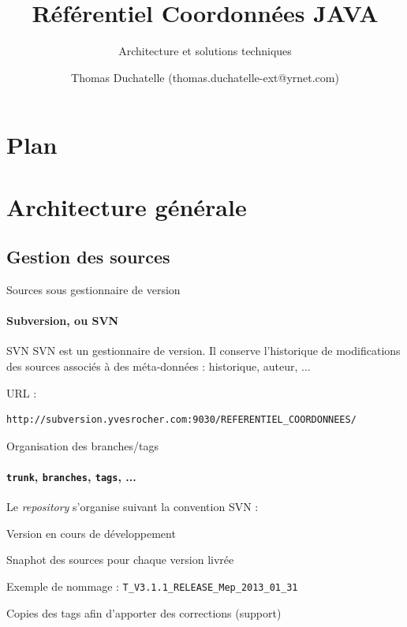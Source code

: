 \documentclass[compact]{beamer}%
\title{Référentiel Coordonnées JAVA}
\subtitle{Architecture et solutions techniques}
\author{Thomas Duchatelle (thomas.duchatelle-ext@yrnet.com)}
\institute{Yves Rocher}
\begin{document}
\frame{\titlepage}
  
\section*{Plan}
\frame{\tableofcontents[hideallsubsections]}
	
\section{Architecture générale}

\subsection{Gestion des sources}

\begin{frame}[fragile]{Sources sous gestionnaire de version}
	\framesubtitle{Subversion, ou SVN}

	\begin{block}{SVN}
	SVN est un gestionnaire de version. Il conserve l'historique de modifications des sources associés à des méta-données : historique, auteur, ...
	\end{block}
	
	\pause
	URL : 
	\begin{lstlisting}
http://subversion.yvesrocher.com:9030/REFERENTIEL_COORDONNEES/
	\end{lstlisting}	

\end{frame}

\begin{frame}{Organisation des branches/tags}
	\framesubtitle{\texttt{trunk}, \texttt{branches}, \texttt{tags}, ...}
	
	Le \emph{repository} s'organise suivant la convention SVN :
	\begin{description}[<+->]
	\item[trunk] Version en cours de développement
	\item[tags] Snaphot des sources pour chaque version livrée\par
	Exemple de nommage : \texttt{T\_V3.1.1\_RELEASE\_Mep\_2013\_01\_31}
	\item[branches] Copies des tags afin d'apporter des corrections (support)
	\end{description}

\end{frame}
\end{document}
